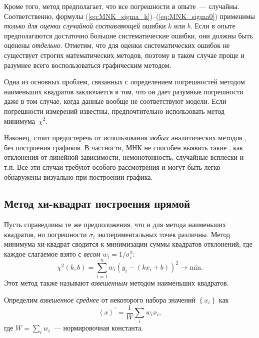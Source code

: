 Кроме того, метод предполагает, что все погрешности в опыте~---
случайны. Соответственно, формулы (\ref{eq:MNK_sigma_k})--(\ref{eq:MNK_sigma0})
применимы \emph{только для оценки случайной составляющей} ошибки $k$
или $b$. Если в опыте предполагаются достаточно большие систематические
ошибки, они должны быть оценены \emph{отдельно}. Отметим, что для
оценки систематических ошибок не существует строгих математических
методов, поэтому в таком случае проще и разумнее всего воспользоваться
графическим методом.

Одна из основных проблем, связанных с определением погрешностей методом
наименьших квадратов заключается в том, что он дает разумные погрешности даже в
том случае, когда данные вообще не соответствуют модели.
Если погрешности измерений известны, предпочтительно использовать
метод минимума~$\chi^2$.

Наконец, стоит предостеречь от использования \emph{любых} аналитических
методов , без построения графиков. В частности, МНК не способен
выявить такие , как отклонения от линейной зависимости,
немонотонность, случайные всплески и т.п. Все эти случаи требуют особого
рассмотрения и могут быть легко обнаружены визуально при построении графика.




\subsection{Метод хи-квадрат построения прямой}
\label{sec:linchi2}
Пусть справедливы те же предположения, что и для метода наименьших квадратов,
но погрешности $\sigma_{i}$ экспериментальных точек различны. Метод
минимума хи-квадрат сводится к минимизации суммы квадратов отклонений,
где каждое слагаемое взято с \emph{весом} $w_i = 1/\sigma_i^2$:
 \[
 \chi^2(k,b)=\sum\limits _{i=1}^{n}w_{i} \left(y_i-(kx_i+b)\right)^{2}\to\mathrm{min}.
\]
Этот метод также называют \emph{взвешенным} методом наименьших квадратов.

Определим \emph{взвешенное среднее} от
некоторого набора значений $\left\{x_{i}\right\}$ как
\[
\left\langle x\right\rangle ^{\prime}=\frac{1}{W}\sum_{i}w_{i}x_{i},
\]
где $W=\sum\limits_{i}w_{i}$~--- нормировочная константа.

